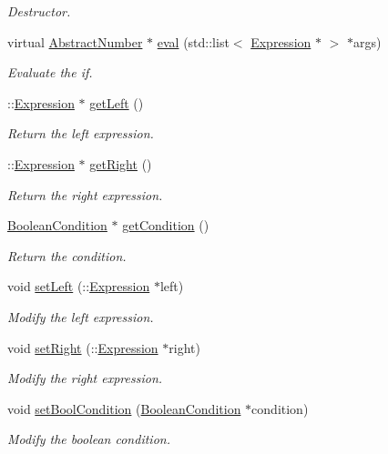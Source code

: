 \begin{DoxyCompactItemize}
\begin{DoxyCompactList}\small\item\em Destructor. \end{DoxyCompactList}\item 
virtual \hyperlink{class_abstract_number}{Abstract\-Number} $\ast$ \hyperlink{class_if_then_else_af535b187cfbd3a2f7ea3704d23dbcfa8}{eval} (std\-::list$<$ \hyperlink{class_expression}{Expression} $\ast$ $>$ $\ast$args)
\begin{DoxyCompactList}\small\item\em Evaluate the if. \end{DoxyCompactList}\item 
\-::\hyperlink{class_expression}{Expression} $\ast$ \hyperlink{class_if_then_else_a90885fff45494cab3c6c2461ebfa7277}{get\-Left} ()
\begin{DoxyCompactList}\small\item\em Return the left expression. \end{DoxyCompactList}\item 
\-::\hyperlink{class_expression}{Expression} $\ast$ \hyperlink{class_if_then_else_ab2ffd8ec427ba4fa86284d21f1fe7f87}{get\-Right} ()
\begin{DoxyCompactList}\small\item\em Return the right expression. \end{DoxyCompactList}\item 
\hyperlink{class_boolean_condition}{Boolean\-Condition} $\ast$ \hyperlink{class_if_then_else_adfd61f38868f9e63d7ab3f61023ca39a}{get\-Condition} ()
\begin{DoxyCompactList}\small\item\em Return the condition. \end{DoxyCompactList}\item 
void \hyperlink{class_if_then_else_a0477e20916d36241b92ac64d799ea2c1}{set\-Left} (\-::\hyperlink{class_expression}{Expression} $\ast$left)
\begin{DoxyCompactList}\small\item\em Modify the left expression. \end{DoxyCompactList}\item 
void \hyperlink{class_if_then_else_a169fc4074f3ab0eee0c4ef107de8b6a2}{set\-Right} (\-::\hyperlink{class_expression}{Expression} $\ast$right)
\begin{DoxyCompactList}\small\item\em Modify the right expression. \end{DoxyCompactList}\item 
void \hyperlink{class_if_then_else_a9fdafff73584bfffebf3cc798f20b6cd}{set\-Bool\-Condition} (\hyperlink{class_boolean_condition}{Boolean\-Condition} $\ast$condition)
\begin{DoxyCompactList}\small\item\em Modify the boolean condition. \end{DoxyCompactList}\end{DoxyCompactItemize}
